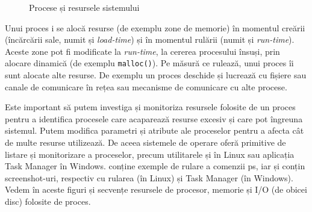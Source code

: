 \begin{figure}[!htbp]
	\centering
	\def\svgwidth{0.8\textwidth}
	
	\caption{Procese și resursele sistemului}
	\label{fig:process:resources}
\end{figure}

Unui proces i se alocă resurse (de exemplu zone de memorie) în momentul creării
(încărcării sale, numit și \textit{load-time}) și în momentul rulării (numit și
\textit{run-time}). Aceste zone pot fi modificate la \textit{run-time}, la cererea procesului
însuși, prin alocare dinamică (de exemplu \texttt{malloc()}). Pe măsură ce rulează, unui
proces îi sunt alocate alte resurse. De exemplu un proces deschide și lucrează
cu fișiere sau canale de comunicare în rețea sau mecanisme de comunicare cu alte
procese.

Este important să putem investiga și monitoriza resursele folosite de un proces
pentru a identifica procesele care acaparează resurse excesiv și care pot
îngreuna sistemul. Putem modifica parametri și atribute ale proceselor pentru a
afecta cât de multe resurse utilizează. De aceea sistemele de operare oferă
primitive de listare și monitorizare a proceselor, precum utilitarele  și  în
Linux sau aplicația Task Manager în Windows.  conține exemple de rulare a comenzii ps, iar
 și  conțin screenshot-uri, respectiv cu rularea  (în Linux) și Task Manager (în Windows). Vedem în aceste figuri și secvențe resursele de procesor, memorie și
I/O (de obicei disc) folosite de proces.


